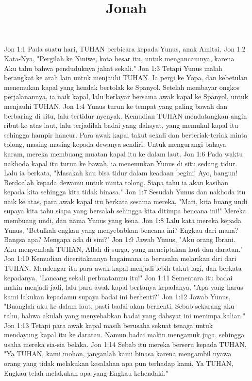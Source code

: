 

\title{Jonah}

Jon 1:1  Pada suatu hari, TUHAN berbicara kepada Yunus, anak Amitai.
Jon 1:2  Kata-Nya, "Pergilah ke Niniwe, kota besar itu, untuk mengancamnya, karena Aku tahu bahwa penduduknya jahat sekali."
Jon 1:3  Tetapi Yunus malah berangkat ke arah lain untuk menjauhi TUHAN. Ia pergi ke Yopa, dan kebetulan menemukan kapal yang hendak bertolak ke Spanyol. Setelah membayar ongkos perjalanannya, ia naik kapal, lalu berlayar bersama awak kapal ke Spanyol, untuk menjauhi TUHAN.
Jon 1:4  Yunus turun ke tempat yang paling bawah dan berbaring di situ, lalu tertidur nyenyak. Kemudian TUHAN mendatangkan angin ribut ke atas laut, lalu terjadilah badai yang dahsyat, yang memukul kapal itu sehingga hampir hancur. Para awak kapal takut sekali dan berteriak-teriak minta tolong, masing-masing kepada dewanya sendiri. Untuk mengurangi bahaya karam, mereka membuang muatan kapal itu ke dalam laut.
Jon 1:6  Pada waktu nakhoda kapal itu turun ke bawah, ia menemukan Yunus di situ sedang tidur. Lalu ia berkata, "Masakah kau bisa tidur dalam keadaan begini! Ayo, bangun! Berdoalah kepada dewamu untuk minta tolong. Siapa tahu ia akan kasihan kepada kita sehingga kita tidak binasa."
Jon 1:7  Sesudah Yunus dan nakhoda itu naik ke atas, para awak kapal itu berkata sesama mereka, "Mari, kita buang undi supaya kita tahu siapa yang bersalah sehingga kita ditimpa bencana ini!" Mereka membuang undi, dan nama Yunus yang kena.
Jon 1:8  Lalu kata mereka kepada Yunus, "Betulkah engkau yang menyebabkan bencana ini? Engkau dari mana? Bangsa apa? Mengapa ada di sini?"
Jon 1:9  Jawab Yunus, "Aku orang Ibrani. Aku menyembah TUHAN, Allah di surga, yang menciptakan laut dan daratan."
Jon 1:10  Kemudian diceritakannya bagaimana ia berusaha melarikan diri dari TUHAN. Mendengar itu para awak kapal menjadi lebih takut lagi, dan berkata kepadanya, "Lancang sekali perbuatanmu itu!"
Jon 1:11  Sementara itu badai makin menjadi-jadi, lalu para awak kapal bertanya kepadanya, "Apa yang harus kami lakukan kepadamu supaya badai ini berhenti?"
Jon 1:12  Jawab Yunus, "Buanglah aku ke dalam laut, pasti badai akan berhenti. Sebab sekarang aku tahu, bahwa akulah yang menyebabkan badai yang dahsyat ini menimpa kalian."
Jon 1:13  Tetapi para awak kapal masih berusaha sekuat tenaga untuk mendayung kapal itu ke daratan. Namun badai makin mengamuk juga, sehingga usaha mereka sia-sia belaka.
Jon 1:14  Sebab itu mereka berseru kepada TUHAN, "Ya TUHAN, kami mohon, janganlah kami binasa karena mengambil nyawa orang yang tidak melakukan kesalahan apa pun terhadap kami. Ya TUHAN, Engkau telah melakukan apa yang Engkau kehendaki."
